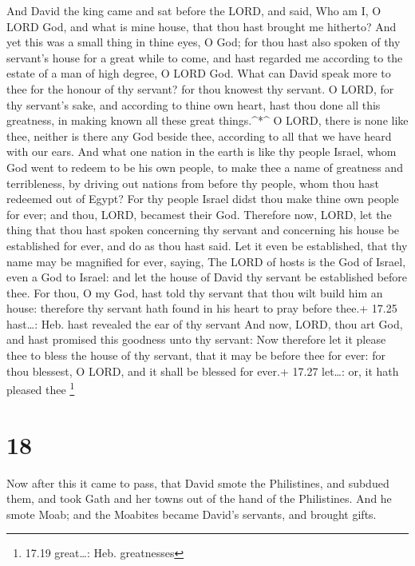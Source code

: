  And David the king came and sat before the LORD, and said,
Who am I, O LORD God, and what is mine house, that thou hast brought me
hitherto?  And yet this was a small thing in thine eyes, O
God; for thou hast also spoken of thy servant's house for a great while
to come, and hast regarded me according to the estate of a man of high
degree, O LORD God.  What can David speak more to thee for
the honour of thy servant? for thou knowest thy servant.  O
LORD, for thy servant's sake, and according to thine own heart, hast
thou done all this greatness, in making known all these great
things.\^{}*\^{}  O LORD, there is none like thee, neither
is there any God beside thee, according to all that we have heard with
our ears.  And what one nation in the earth is like thy
people Israel, whom God went to redeem to be his own people, to make
thee a name of greatness and terribleness, by driving out nations from
before thy people, whom thou hast redeemed out of Egypt? 
For thy people Israel didst thou make thine own people for ever; and
thou, LORD, becamest their God.  Therefore now, LORD, let
the thing that thou hast spoken concerning thy servant and concerning
his house be established for ever, and do as thou hast said.
 Let it even be established, that thy name may be magnified
for ever, saying, The LORD of hosts is the God of Israel, even a God to
Israel: and let the house of David thy servant be established before
thee.  For thou, O my God, hast told thy servant that thou
wilt build him an house: therefore thy servant hath found in his heart
to pray before thee.+ 17.25 hast\ldots: Heb. hast revealed the ear of
thy servant  And now, LORD, thou art God, and hast promised
this goodness unto thy servant:  Now therefore let it
please thee to bless the house of thy servant, that it may be before
thee for ever: for thou blessest, O LORD, and it shall be blessed for
ever.+ 17.27 let\ldots: or, it hath pleased thee \footnote{17.19
  great\ldots: Heb. greatnesses}

\hypertarget{section-17}{%
\section{18}\label{section-17}}

 Now after this it came to pass, that David smote the
Philistines, and subdued them, and took Gath and her towns out of the
hand of the Philistines.  And he smote Moab; and the
Moabites became David's servants, and brought gifts.


